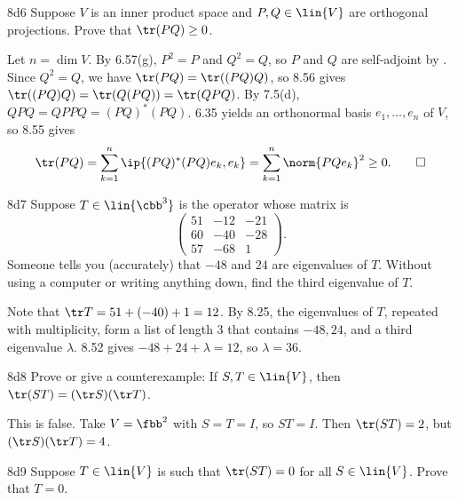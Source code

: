 \begin{exercise}{8d6}
    Suppose $V$ is an inner product space and $P, Q \in \lin{V}$ are orthogonal projections.
    Prove that $\tr(PQ) \geq 0$.
\end{exercise}

\begin{sol}
    Let $n = \dim V$.
    By 6.57(g), $P^2 = P$ and $Q^2 = Q$, so $P$ and $Q$ are self-adjoint by .
    Since $Q^2 = Q$, we have $\tr(PQ) = \tr((PQ)Q)$, so 8.56 gives $\tr((PQ)Q) = \tr(Q(PQ)) = \tr(QPQ)$.
    By 7.5(d), $QPQ = QPPQ = (PQ)^\ast (PQ)$.
    6.35 yields an orthonormal basis $e_1, \ldots, e_n$ of $V$, so 8.55 gives
    \[
        \tr(PQ) = \sum_{k=1}^n \ip{(PQ)^\ast (PQ) e_k, e_k} = \sum_{k=1}^n \norm{PQ e_k}^2 \geq 0. \qedhere
    \]
\end{sol}

\begin{exercise}{8d7}
    Suppose $T \in \lin{\cbb^3}$ is the operator whose matrix is
    \[
        \begin{pmatrix}
            51 & -12 & -21 \\
            60 & -40 & -28 \\
            57 & -68 & 1
        \end{pmatrix}.
    \]
    Someone tells you (accurately) that $-48$ and $24$ are eigenvalues of $T$.
    Without using a computer or writing anything down, find the third eigenvalue of $T$.
\end{exercise}

\begin{sol}
    Note that $\tr T = 51 + (-40) + 1 = 12$.
    By 8.25, the eigenvalues of $T$, repeated with multiplicity, form a list of length 3 that contains $-48, 24$, and a third eigenvalue $\lambda$.
    8.52 gives $-48 + 24 + \lambda = 12$, so $\lambda = 36$.
\end{sol}

\begin{exercise}{8d8}
    Prove or give a counterexample: If $S, T \in \lin{V}$, then $\tr(ST) = (\tr S)(\tr T)$.
\end{exercise}

\begin{sol}
    This is false. Take $V = \fbb^2$ with $S = T = I$, so $ST = I$.
    Then $\tr(ST) = 2$, but $(\tr S)(\tr T) = 4$.
\end{sol}

\begin{exercise}{8d9}
    Suppose $T \in \lin{V}$ is such that $\tr(ST) = 0$ for all $S \in \lin{V}$.
    Prove that $T = 0$.
\end{exercise}

